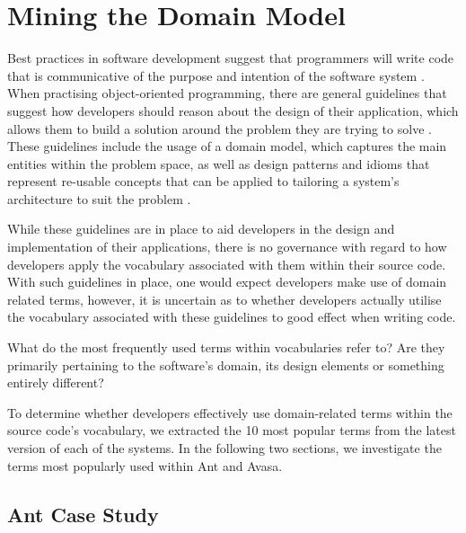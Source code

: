 

\section{Mining the Domain Model} %
\label{sec:mining_the_domain_model}

Best practices in software development suggest that programmers will write code that is communicative of the purpose and intention of the software system \cite{Abelson96a}. When practising object-oriented programming, there are general guidelines that suggest how developers should reason about the design of their application, which allows them to build a solution around the problem they are trying to solve \cite{Wirfs90a}. These guidelines include the usage of a domain model, which captures the main entities within the problem space, as well as design patterns and idioms that represent re-usable concepts that can be applied to tailoring a system's architecture to suit the problem \cite{Gamma95a}.

While these guidelines are in place to aid developers in the design and implementation of their applications, there is no governance with regard to how developers apply the vocabulary associated with them within their source code. With such guidelines in place, one would expect developers make use of domain related terms, however, it is uncertain as to whether developers actually utilise the vocabulary associated with these guidelines to good effect when writing code.

What do the most frequently used terms within vocabularies refer to? Are they primarily pertaining to the software's domain, its design elements or something entirely different?

To determine whether developers effectively use domain-related terms within the source code's vocabulary, we extracted the 10 most popular terms from the latest version of each of the systems. In the following two sections, we investigate the terms most popularly used within Ant and Avasa.

\subsection{Ant Case Study} %
\label{sub:ant_case_study}

